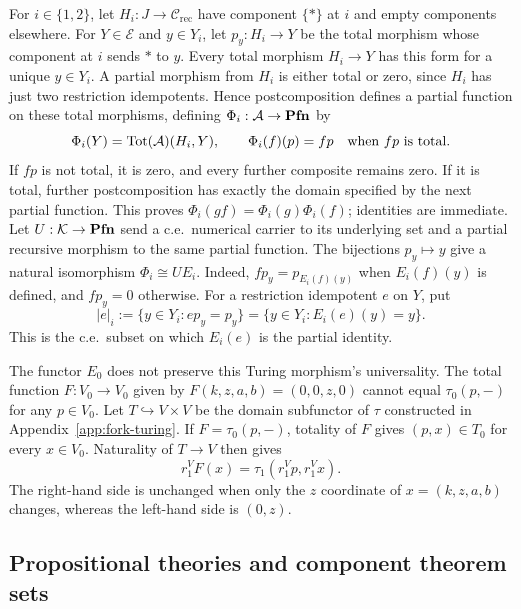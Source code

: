 For $i\in\{1,2\}$, let $H_i:J\to\mathcal C_{\mathrm{rec}}$
have component $\{*\}$ at $i$ and empty components elsewhere.
For $Y\in\mathcal E$ and $y\in Y_i$, let $p_y:H_i\to Y$ be the total morphism
whose component at $i$ sends $*$ to $y$. Every total morphism
$H_i\to Y$ has this form for a unique $y\in Y_i$. A partial
morphism from $H_i$ is either total or zero, since $H_i$ has just
two restriction idempotents. Hence postcomposition defines a partial
function on these total morphisms, defining
$\Phi_i:\mathcal A\to\mathbf{Pfn}$ by
\[
 \Phi_i(Y)=\operatorname{Tot}(\mathcal A)(H_i,Y),\qquad
 \Phi_i(f)(p)=fp\quad\hbox{when }fp\hbox{ is total}.
\]
If $fp$ is not total, it is zero, and every further composite
remains zero. If it is total, further postcomposition has exactly
the domain specified by the next partial function. This proves
$\Phi_i(gf)=\Phi_i(g)\Phi_i(f)$; identities are immediate.
Let $U:\mathcal K\to\mathbf{Pfn}$ send a c.e.\ numerical carrier to its
underlying set and a partial recursive morphism to the same partial
function. The bijections $p_y\mapsto y$ give a natural isomorphism
$\Phi_i\cong U E_i$.
Indeed, $fp_y=p_{E_i(f)(y)}$ when $E_i(f)(y)$ is defined, and $fp_y=0$
otherwise.
For a restriction idempotent $e$ on $Y$, put
\begin{equation}\label{eq:probe-domain}
 |e|_i:=\{y\in Y_i:ep_y=p_y\}
       =\{y\in Y_i:E_i(e)(y)=y\}.
\end{equation}
This is the c.e.\ subset on which $E_i(e)$ is the partial identity.

The functor $E_0$ does not preserve this Turing morphism's universality.
The total function $F:V_0\to V_0$ given by
$F(k,z,a,b)=(0,0,z,0)$ cannot equal $\tau_0(p,-)$ for any $p\in V_0$.
Let $T\hookrightarrow V\times V$ be the domain subfunctor of
$\tau$ constructed in Appendix~\ref{app:fork-turing}.
If $F=\tau_0(p,-)$, totality of $F$ gives $(p,x)\in T_0$
for every $x\in V_0$. Naturality of $T\to V$ then gives
\[
 r_1^V F(x)=\tau_1(r_1^Vp,r_1^Vx).
\]
The right-hand side is unchanged when only the $z$ coordinate
of $x=(k,z,a,b)$ changes, whereas the left-hand side is $(0,z)$.

\subsection{Propositional theories and component theorem sets}

